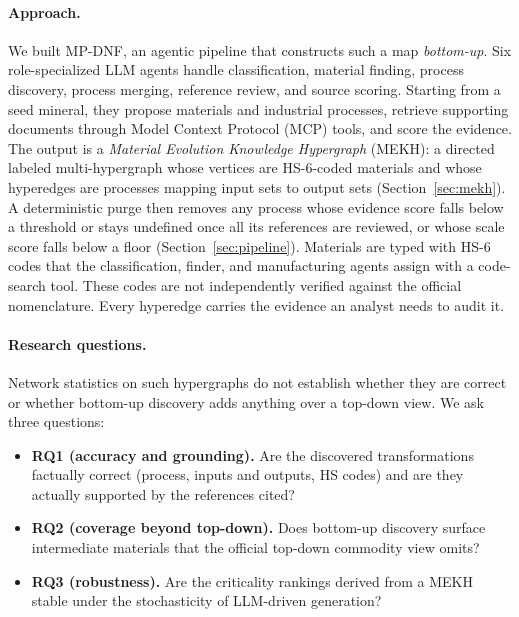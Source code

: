 \paragraph{Approach.}
We built MP-DNF, an agentic pipeline that constructs such a map \emph{bottom-up}. Six role-specialized LLM agents handle classification, material finding, process discovery, process merging, reference review, and source scoring. Starting from a seed mineral, they propose materials and industrial processes, retrieve supporting documents through Model Context Protocol (MCP) tools, and score the evidence. The output is a \emph{Material Evolution Knowledge Hypergraph} (MEKH): a directed labeled multi-hypergraph whose vertices are HS-6-coded materials and whose hyperedges are processes mapping input sets to output sets (Section~\ref{sec:mekh}). A deterministic purge then removes any process whose evidence score falls below a threshold or stays undefined once all its references are reviewed, or whose scale score falls below a floor (Section~\ref{sec:pipeline}). Materials are typed with HS-6 codes that the classification, finder, and manufacturing agents assign with a code-search tool. These codes are not independently verified against the official nomenclature. Every hyperedge carries the evidence an analyst needs to audit it.

\paragraph{Research questions.}
Network statistics on such hypergraphs do not establish whether they are correct or whether bottom-up discovery adds anything over a top-down view. We ask three questions:
\begin{itemize}[leftmargin=*,nosep]
  \item \textbf{RQ1 (accuracy and grounding).} Are the discovered transformations factually correct (process, inputs and outputs, HS codes) and are they actually supported by the references cited?
  \item \textbf{RQ2 (coverage beyond top-down).} Does bottom-up discovery surface intermediate materials that the official top-down commodity view omits?
  \item \textbf{RQ3 (robustness).} Are the criticality rankings derived from a MEKH stable under the stochasticity of LLM-driven generation?
\end{itemize}

